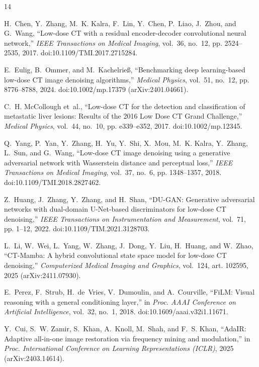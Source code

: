 \begin{thebibliography}{14}

H.~Chen, Y.~Zhang, M.~K. Kalra, F.~Lin, Y.~Chen, P.~Liao, J.~Zhou, and G.~Wang,
``Low-dose CT with a residual encoder-decoder convolutional neural network,''
\emph{IEEE Transactions on Medical Imaging}, vol.~36, no.~12, pp. 2524--2535, 2017.
doi:10.1109/TMI.2017.2715284.

E.~Eulig, B.~Ommer, and M.~Kachelrie{\ss},
``Benchmarking deep learning-based low-dose CT image denoising algorithms,''
\emph{Medical Physics}, vol.~51, no.~12, pp. 8776--8788, 2024.
doi:10.1002/mp.17379 (arXiv:2401.04661).

C.~H. McCollough et~al.,
``Low-dose CT for the detection and classification of metastatic liver lesions: Results of the 2016 Low Dose CT Grand Challenge,''
\emph{Medical Physics}, vol.~44, no.~10, pp. e339--e352, 2017.
doi:10.1002/mp.12345.

Q.~Yang, P.~Yan, Y.~Zhang, H.~Yu, Y.~Shi, X.~Mou, M.~K. Kalra, Y.~Zhang, L.~Sun, and G.~Wang,
``Low-dose CT image denoising using a generative adversarial network with Wasserstein distance and perceptual loss,''
\emph{IEEE Transactions on Medical Imaging}, vol.~37, no.~6, pp. 1348--1357, 2018.
doi:10.1109/TMI.2018.2827462.

Z.~Huang, J.~Zhang, Y.~Zhang, and H.~Shan,
``DU-GAN: Generative adversarial networks with dual-domain U-Net-based discriminators for low-dose CT denoising,''
\emph{IEEE Transactions on Instrumentation and Measurement}, vol.~71, pp. 1--12, 2022.
doi:10.1109/TIM.2021.3128703.

L.~Li, W.~Wei, L.~Yang, W.~Zhang, J.~Dong, Y.~Liu, H.~Huang, and W.~Zhao,
``CT-Mamba: A hybrid convolutional state space model for low-dose CT denoising,''
\emph{Computerized Medical Imaging and Graphics}, vol.~124, art. 102595, 2025
(arXiv:2411.07930).

E.~Perez, F.~Strub, H.~de~Vries, V.~Dumoulin, and A.~Courville,
``FiLM: Visual reasoning with a general conditioning layer,''
in \emph{Proc. AAAI Conference on Artificial Intelligence}, vol.~32, no.~1, 2018.
doi:10.1609/aaai.v32i1.11671.

Y.~Cui, S.~W. Zamir, S.~Khan, A.~Knoll, M.~Shah, and F.~S. Khan,
``AdaIR: Adaptive all-in-one image restoration via frequency mining and modulation,''
in \emph{Proc. International Conference on Learning Representations (ICLR)}, 2025
(arXiv:2403.14614).


\end{thebibliography}
